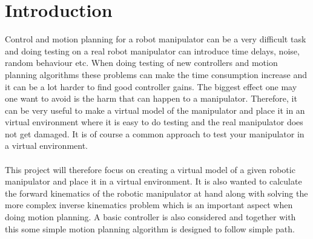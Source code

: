 \chapter{Introduction}

Control and motion planning for a robot manipulator can be a very difficult task and doing testing on a real robot manipulator can introduce time delays, noise, random behaviour etc. When doing testing of new controllers and motion planning algorithms these problems can make the time consumption increase and it can be a lot harder to find good controller gains. The biggest effect one may one want to avoid is the harm that can happen to a manipulator. Therefore, it can be very useful to make a virtual model of the manipulator and place it in an virtual environment where it is easy to do testing and the real manipulator does not get damaged. It is of course a common approach to test your manipulator in a virtual environment.\\\\
This project will therefore focus on creating a virtual model of a given robotic manipulator and place it in a virtual environment. It is also wanted to calculate the forward kinematics of the robotic manipulator at hand along with solving the more complex inverse kinematics problem which is an important aspect when doing motion planning. A basic controller is also considered and together with this some simple motion planning algorithm is designed to follow simple path. \\\\
    






